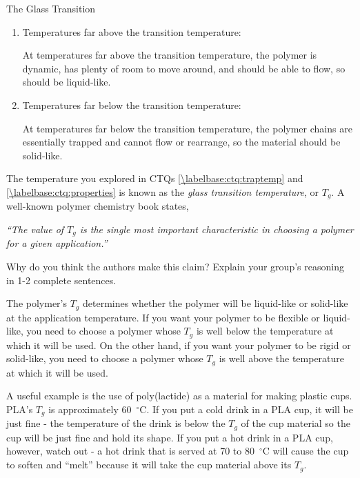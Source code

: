 \begin{activity}{The Glass Transition}
\begin{ctqs}
		\begin{enumerate}
			\item Temperatures far above the transition temperature:
			
				\begin{solution}[0.5in]
					At temperatures far above the transition temperature, the polymer is dynamic, has plenty of room to move around, and should be able to flow, so should be liquid-like.
				\end{solution}
			
			\item Temperatures far below the transition temperature:
			
				\begin{solution}[0.5in]
					At temperatures far below the transition temperature, the polymer chains are essentially trapped and cannot flow or rearrange, so the material should be solid-like.
				\end{solution}
			
		\end{enumerate}
		
	\question The temperature you explored in CTQs \ref{\labelbase:ctq:traptemp} and \ref{\labelbase:ctq:properties} is known as the \emph{glass transition temperature}, or $T_g$.  A well-known polymer chemistry book states,
	
		\emph{``The value of $T_g$ is the single most important characteristic in choosing a polymer for a given application.''}
		
		Why do you think the authors make this claim?  Explain your group's reasoning in 1-2 complete sentences.
			
				\begin{solution}[1.75in]
				
					The polymer's $T_g$ determines whether the polymer will be liquid-like or solid-like at the application temperature.  If you want your polymer to be flexible or liquid-like, you need to choose a polymer whose $T_g$ is well below the temperature at which it will be used.  On the other hand, if you want your polymer to be rigid or solid-like, you need to choose a polymer whose $T_g$ is well above the temperature at which it will be used.
					
					A useful example is the use of poly(lactide) as a material for making plastic cups.  PLA's $T_g$ is approximately 60~$^\circ$C.  If you put a cold drink in a PLA cup, it will be just fine - the temperature of the drink is below the $T_g$ of the cup material so the cup will be just fine and hold its shape.  If you put a hot drink in a PLA cup, however, watch out - a hot drink that is served at 70 to 80~$^\circ$C will cause the cup to soften and ``melt'' because it will take the cup material above its $T_g$.
					

\end{solution}
\end{ctqs}
\end{activity}
